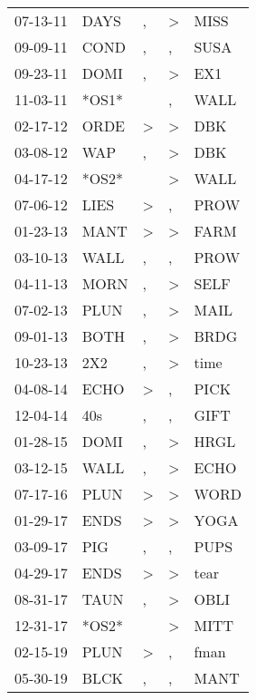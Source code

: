 \begin{supertabular}{lllll}
 07-13-11 &   DAYS &             , &     \textgreater &   MISS \\
 09-09-11 &   COND &             , &                , &   SUSA \\
 09-23-11 &   DOMI &             , &     \textgreater &    EX1 \\
 11-03-11 &  *OS1* &               &                , &   WALL \\
 02-17-12 &   ORDE &  \textgreater &     \textgreater &    DBK \\
 03-08-12 &    WAP &             , &     \textgreater &    DBK \\
 04-17-12 &  *OS2* &               &     \textgreater &   WALL \\
 07-06-12 &   LIES &  \textgreater &                , &   PROW \\
 01-23-13 &   MANT &  \textgreater &     \textgreater &   FARM \\
 03-10-13 &   WALL &             , &                , &   PROW \\
 04-11-13 &   MORN &             , &     \textgreater &   SELF \\
 07-02-13 &   PLUN &             , &     \textgreater &   MAIL \\
 09-01-13 &   BOTH &             , &     \textgreater &   BRDG \\
 10-23-13 &    2X2 &             , &     \textgreater &   time \\
 04-08-14 &   ECHO &  \textgreater &                , &   PICK \\
 12-04-14 &    40s &             , &                , &   GIFT \\
 01-28-15 &   DOMI &             , &     \textgreater &   HRGL \\
 03-12-15 &   WALL &             , &     \textgreater &   ECHO \\
 07-17-16 &   PLUN &  \textgreater &     \textgreater &   WORD \\
 01-29-17 &   ENDS &  \textgreater &     \textgreater &   YOGA \\
 03-09-17 &    PIG &             , &                , &   PUPS \\
 04-29-17 &   ENDS &  \textgreater &     \textgreater &   tear \\
 08-31-17 &   TAUN &             , &     \textgreater &   OBLI \\
 12-31-17 &  *OS2* &               &     \textgreater &   MITT \\
 02-15-19 &   PLUN &  \textgreater &                , &   fman \\
 05-30-19 &   BLCK &             , &                , &   MANT \\
\end{supertabular}

